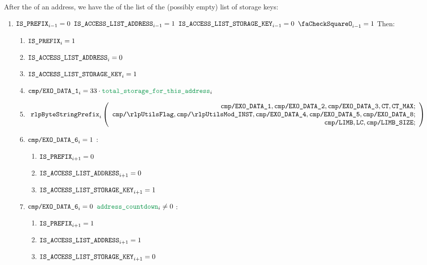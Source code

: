 \begin{enumerate}[resume]
		After the \rlp{} of an address, we have the \rlp{} of the list of the (possibly empty) list of storage keys:
		\begin{enumerate}[resume]
			\item \If $\texttt{\texttt{IS\_PREFIX}} _{i - 1} = 0$ \et $\texttt{IS\_ACCESS\_LIST\_ADDRESS} _{i - 1} = 1$ \et $\texttt{IS\_ACCESS\_LIST\_STORAGE\_KEY} _{i - 1} = 0$ \et $\done _{i - 1} =1$ Then:
				\begin{enumerate}
					\item $\texttt{\texttt{IS\_PREFIX}} _{i} = 1$
					\item $\texttt{IS\_ACCESS\_LIST\_ADDRESS}   _{i} = 0$
					\item $\texttt{IS\_ACCESS\_LIST\_STORAGE\_KEY}    _{i} = 1$
					\item $\rlpTxnComputationColumnExoDataColumn{1} _{i} = 33 \cdot \locTotStorageForThisAddress _{i}$
					\item
						\[
							\rlpBytestringPrefix _{i}
							\left(
							\begin{array}{r}
								\rlpTxnComputationColumnExoDataColumn{1},
								\rlpTxnComputationColumnExoDataColumn{2},
								\rlpTxnComputationColumnExoDataColumn{3},
								\ct,
								\maxCt; \\
								\rlpTxnComputationColumnRlpUtilsFlag,
								\rlpTxnComputationColumnRlpUtilsInstruction,
								\rlpTxnComputationColumnExoDataColumn{4},
								\rlpTxnComputationColumnExoDataColumn{5},
								\rlpTxnComputationColumnExoDataColumn{8}; \\
								\rlpTxnComputationColumnLimb,
								\lc,
								\rlpTxnComputationColumnLimbSize; \\
							\end{array}
							\right)
						\]

					\item \If $\texttt{cmp}\texttt{/}\texttt{{\texttt{EXO\_DATA\_6}}} _{i} = 1$ \Then:
						\begin{enumerate}
							\item $\texttt{\texttt{IS\_PREFIX}} _{i + 1} = 0$
							\item $\texttt{IS\_ACCESS\_LIST\_ADDRESS}   _{i + 1} = 0$
							\item $\texttt{IS\_ACCESS\_LIST\_STORAGE\_KEY}    _{i + 1} = 1$
						\end{enumerate}

					\item \If $\texttt{cmp}\texttt{/}\texttt{{\texttt{EXO\_DATA\_6}}} _{i} = 0$ \et $\locAddressPrewarmingCountdown _{i} \neq 0$ \Then:
						\begin{enumerate}
							\item $\texttt{\texttt{IS\_PREFIX}} _{i + 1} = 1$
							\item $\texttt{IS\_ACCESS\_LIST\_ADDRESS}   _{i + 1} = 1$
							\item $\texttt{IS\_ACCESS\_LIST\_STORAGE\_KEY}    _{i + 1} = 0$
						\end{enumerate}


\end{enumerate}
\end{enumerate}
\end{enumerate}
